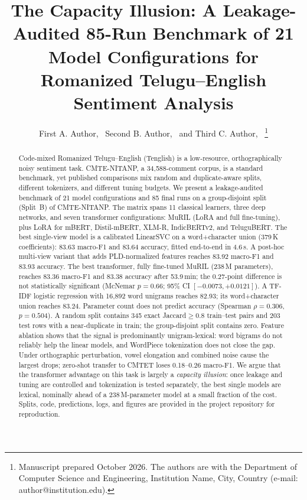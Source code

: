 \documentclass[10pt,journal]{IEEEtran}
\author{First A. Author,~\IEEEmembership{Student Member,~IEEE,}
        Second B. Author,~\IEEEmembership{Member,~IEEE,}
        and Third C. Author,~\IEEEmembership{Senior Member,~IEEE}%
\thanks{Manuscript prepared October 2026. The authors are with the Department of Computer Science and Engineering, Institution Name, City, Country (e-mail: author@institution.edu).}}
\begin{document}
\title{The Capacity Illusion: A Leakage-Audited 85-Run Benchmark of 21 Model Configurations for Romanized Telugu--English Sentiment Analysis}

\maketitle

\begin{abstract}
Code-mixed Romanized Telugu--English (Tenglish) is a low-resource, orthographically noisy sentiment task. CMTE-NITANP, a 34{,}588-comment corpus, is a standard benchmark, yet published comparisons mix random and duplicate-aware splits, different tokenizers, and different tuning budgets. We present a leakage-audited benchmark of 21 model configurations and 85 final runs on a group-disjoint split (Split~B) of CMTE-NITANP. The matrix spans 11 classical learners, three deep networks, and seven transformer configurations: MuRIL (LoRA and full fine-tuning), plus LoRA for mBERT, Distil-mBERT, XLM-R, IndicBERTv2, and TeluguBERT. The best single-view model is a calibrated LinearSVC on a word+character union (379\,K coefficients): 83.63 macro-F1 and 83.64 accuracy, fitted end-to-end in 4.6\,s. A post-hoc multi-view variant that adds PLD-normalized features reaches 83.92 macro-F1 and 83.93 accuracy. The best transformer, fully fine-tuned MuRIL (238\,M parameters), reaches 83.36 macro-F1 and 83.38 accuracy after 53.9\,min; the 0.27-point difference is not statistically significant (McNemar $p=0.66$; 95\% CI $[-0.0073,+0.0121]$). A TF-IDF logistic regression with 16{,}892 word unigrams reaches 82.93; its word+character union reaches 83.24. Parameter count does not predict accuracy (Spearman $\rho=0.306$, $p=0.504$). A random split contains 345 exact Jaccard$\geq0.8$ train--test pairs and 203 test rows with a near-duplicate in train; the group-disjoint split contains zero. Feature ablation shows that the signal is predominantly unigram-lexical: word bigrams do not reliably help the linear models, and WordPiece tokenization does not close the gap. Under orthographic perturbation, vowel elongation and combined noise cause the largest drops; zero-shot transfer to CMTET loses 0.18--0.26 macro-F1. We argue that the transformer advantage on this task is largely a \emph{capacity illusion}: once leakage and tuning are controlled and tokenization is tested separately, the best single models are lexical, nominally ahead of a 238\,M-parameter model at a small fraction of the cost. Splits, code, predictions, logs, and figures are provided in the project repository for reproduction.
\end{abstract}
\end{document}
